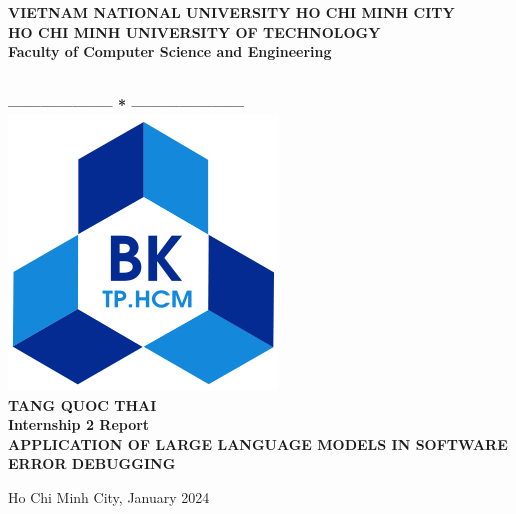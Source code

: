 \documentclass[a4paper,oneside]{book}
\begin{document}
\begin{titlepage}
    \thispagestyle{empty}
    \usetikzlibrary{calc}

    \begin{center}
        \begin{large}
            {\fontsize{12pt}{1}\textbf{VIETNAM NATIONAL UNIVERSITY HO CHI MINH CITY}} \\
            \fontsize{12pt}{1}\textbf{HO CHI MINH UNIVERSITY OF TECHNOLOGY} \\
            \fontsize{12pt}{1}\textbf{Faculty of Computer Science and Engineering}
        \end{large} \\
        \textbf{--------------------  *  ---------------------}\\

        \vspace{0.8cm}
        \includegraphics[scale=.35]{img/hcmut}\\
        \vspace{0.8cm}
        {\fontsize{14.4pt}{1}\selectfont \textbf{TANG QUOC THAI}}\\[.75cm]
        \vspace{0.8cm}
        {\fontsize{14.4pt}{1}\selectfont \textbf{Internship 2 Report}}\\[.75cm]
        {\fontsize{17pt}{1}\selectfont \textbf{\MakeUppercase{APPLICATION OF LARGE LANGUAGE MODELS IN SOFTWARE ERROR DEBUGGING}}}
    \end{center}
    \vspace{4cm}

    \hspace{.5cm}
    \begin{center}
        {\fontsize{15pt}{1} Ho Chi Minh City, January 2024}
    \end{center}
\end{titlepage}
\newpage
\end{document}
